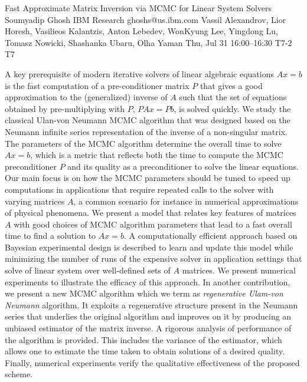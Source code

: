 \documentclass[12pt,lettersize,oneside]{book} %
\begin{document}
\begin{talk}
  {Fast Approximate Matrix Inversion via MCMC for Linear System Solvers}%
  {Soumyadip Ghosh}%
  {IBM Research}%
  {ghoshs@us.ibm.com}%
  {Vassil Alexandrov, Lior Horesh, Vasilieos Kalantzis, Anton Lebedev,  WonKyung Lee, Yingdong Lu, Tomasz Nowicki, Shashanka Ubaru, Olha Yaman}%
  {}%
  {Thu, Jul 31 16:00--16:30}%
  {T7-2}%
  {T7}%
  
    
   
A key prerequisite of modern iterative solvers of linear algebraic equations $Ax=b$ is the fast computation of a pre-conditioner matrix $P$ that gives a good approximation to the (generalized) inverse of $A$ such that the set of equations obtained by pre-multiplying with $P$, $PAx=Pb$, is solved quickly. 
We study the classical Ulan-von Neumann MCMC algorithm that was designed based on the Neumann infinite series representation of the inverse of a non-singular matrix. The parameters of the MCMC algorithm determine the overall time to solve $Ax=b$, which is a metric that 
reflects both the time to compute the MCMC preconditioner $P$ and its quality as a preconditioner to solve the linear equations. Our main focus is on how the MCMC parameters should be tuned to speed up computations in applications that require repeated calls to the solver with varying matrices $A$, a common scenario for instance in numerical approximations of physical phenomena. 
We present a model that relates key features of matrices $A$ with good choices of MCMC algorithm parameters that lead to a fast overall time to find a solution to $Ax=b$. A computationally efficient approach based on Bayesian experimental design is described to learn and update this model while minimizing the number of runs of the expensive solver in application settings that solve of linear system over well-defined sets of $A$ matrices. We present numerical experiments to illustrate the efficacy of this approach.
In another contribution, we present a new MCMC algorithm which we term as \emph{regenerative Ulam-von Neumann} algorithm. It exploits a regenerative structure present in the Neumann series that underlies the original algorithm and improves on it by producing an unbiased estimator of the matrix inverse. A rigorous analysis of performance of the algorithm is provided. This includes the variance of the estimator, which allows one to estimate the time taken to obtain solutions of a desired quality. Finally, numerical experiments verify the qualitative effectiveness of the proposed scheme. 

\end{talk}
\end{document}
